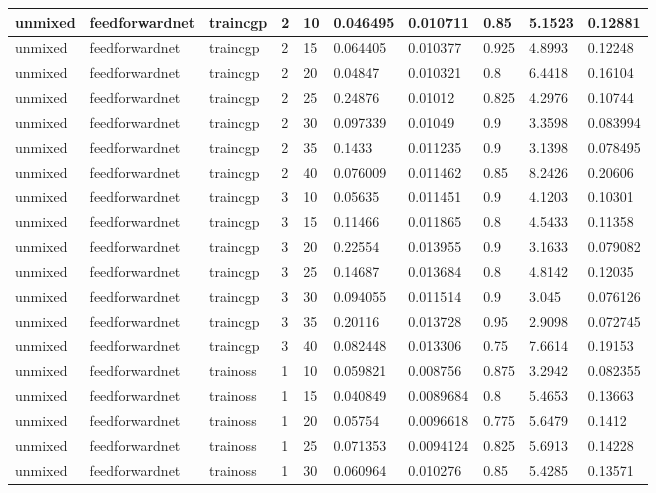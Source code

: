 \begin{longtable}{lllllllll}
unmixed & feedforwardnet & traincgp & 2 & 10 & 0.046495 & 0.010711 & 0.85 & 5.1523 & 0.12881 \\ \hline 
unmixed & feedforwardnet & traincgp & 2 & 15 & 0.064405 & 0.010377 & 0.925 & 4.8993 & 0.12248 \\ \hline 
unmixed & feedforwardnet & traincgp & 2 & 20 & 0.04847 & 0.010321 & 0.8 & 6.4418 & 0.16104 \\ \hline 
unmixed & feedforwardnet & traincgp & 2 & 25 & 0.24876 & 0.01012 & 0.825 & 4.2976 & 0.10744 \\ \hline 
unmixed & feedforwardnet & traincgp & 2 & 30 & 0.097339 & 0.01049 & 0.9 & 3.3598 & 0.083994 \\ \hline 
unmixed & feedforwardnet & traincgp & 2 & 35 & 0.1433 & 0.011235 & 0.9 & 3.1398 & 0.078495 \\ \hline 
unmixed & feedforwardnet & traincgp & 2 & 40 & 0.076009 & 0.011462 & 0.85 & 8.2426 & 0.20606 \\ \hline 
unmixed & feedforwardnet & traincgp & 3 & 10 & 0.05635 & 0.011451 & 0.9 & 4.1203 & 0.10301 \\ \hline 
unmixed & feedforwardnet & traincgp & 3 & 15 & 0.11466 & 0.011865 & 0.8 & 4.5433 & 0.11358 \\ \hline 
unmixed & feedforwardnet & traincgp & 3 & 20 & 0.22554 & 0.013955 & 0.9 & 3.1633 & 0.079082 \\ \hline 
unmixed & feedforwardnet & traincgp & 3 & 25 & 0.14687 & 0.013684 & 0.8 & 4.8142 & 0.12035 \\ \hline 
unmixed & feedforwardnet & traincgp & 3 & 30 & 0.094055 & 0.011514 & 0.9 & 3.045 & 0.076126 \\ \hline 
unmixed & feedforwardnet & traincgp & 3 & 35 & 0.20116 & 0.013728 & 0.95 & 2.9098 & 0.072745 \\ \hline 
unmixed & feedforwardnet & traincgp & 3 & 40 & 0.082448 & 0.013306 & 0.75 & 7.6614 & 0.19153 \\ \hline 
unmixed & feedforwardnet & trainoss & 1 & 10 & 0.059821 & 0.008756 & 0.875 & 3.2942 & 0.082355 \\ \hline 
unmixed & feedforwardnet & trainoss & 1 & 15 & 0.040849 & 0.0089684 & 0.8 & 5.4653 & 0.13663 \\ \hline 
unmixed & feedforwardnet & trainoss & 1 & 20 & 0.05754 & 0.0096618 & 0.775 & 5.6479 & 0.1412 \\ \hline 
unmixed & feedforwardnet & trainoss & 1 & 25 & 0.071353 & 0.0094124 & 0.825 & 5.6913 & 0.14228 \\ \hline 
unmixed & feedforwardnet & trainoss & 1 & 30 & 0.060964 & 0.010276 & 0.85 & 5.4285 & 0.13571 \\ \hline 

\end{longtable}
